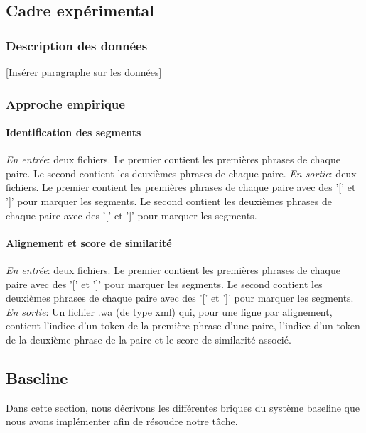 \documentclass[a4paper, twoside, 11pt]{article}
\begin{document}
    \subsection{Cadre expérimental}

        \subsubsection{Description des données}

 [Insérer paragraphe sur les données]

        \subsubsection{Approche empirique}

    \paragraph{Identification des segments}
    \hfill \break
    \textit{En entrée}: deux fichiers. Le premier contient les premières phrases de chaque paire. Le second contient les deuxièmes phrases de chaque paire. \hfill \break
    \textit{En sortie}: deux fichiers. Le premier contient les premières phrases de chaque paire avec des '[' et ']' pour marquer les segments. Le second contient les deuxièmes phrases de chaque paire avec des '[' et ']' pour marquer les segments.

 \paragraph{Alignement et score de similarité}
    \hfill \break
    \textit{En entrée}: deux fichiers. Le premier contient les premières phrases de chaque paire avec des '[' et ']' pour marquer les segments. Le second contient les deuxièmes phrases de chaque paire avec des '[' et ']' pour marquer les segments. \hfill \break
    \textit{En sortie}: Un fichier .wa (de type xml) qui, pour une ligne par alignement, contient l'indice d'un token de la première phrase d'une paire, l'indice d'un token de la deuxième phrase de la paire et le score de similarité associé.



    \subsection{Baseline}

    Dans cette section, nous décrivons les différentes briques du système baseline que nous avons implémenter afin de résoudre notre tâche.
\end{document}
